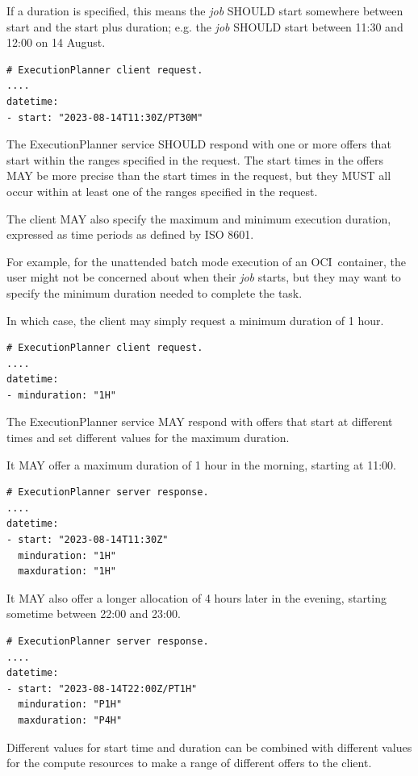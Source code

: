 \documentclass[11pt,a4paper]{ivoa}
\newcommand{\execplanner} {ExecutionPlanner}
\newcommand{\ocicontainer} {OCI~container}
\newcommand{\job} {\textit{job}}
\begin{document}
If a duration is specified, this means the \job{} SHOULD start somewhere between
start and the start plus duration;
e.g. the \job{} SHOULD start between 11:30 and 12:00 on 14 August.
\begin{lstlisting}[]
# ExecutionPlanner client request.
....
datetime:
- start: "2023-08-14T11:30Z/PT30M"
\end{lstlisting}

The \execplanner{} service SHOULD respond with one or more offers that start within
the ranges specified in the request.
The start times in the offers MAY be more precise than the start times in the request,
but they MUST all occur within at least one of the ranges specified in the request.

The client MAY also specify the maximum and minimum execution duration,
expressed as time periods as defined by ISO 8601.

For example, for the unattended batch mode execution of an \ocicontainer, the user might not be concerned about
when their \job{} starts, but they may want to specify the minimum duration needed to complete the task.

In which case, the client may simply request a minimum duration of 1 hour.
\begin{lstlisting}[]
# ExecutionPlanner client request.
....
datetime:
- minduration: "1H"
\end{lstlisting}

The \execplanner{} service MAY respond with offers that start at different times and
set different values for the maximum duration.

It MAY offer a maximum duration of 1 hour in the morning, starting at 11:00.
\begin{lstlisting}[]
# ExecutionPlanner server response.
....
datetime:
- start: "2023-08-14T11:30Z"
  minduration: "1H"
  maxduration: "1H"
\end{lstlisting}

It MAY also offer a longer allocation of 4 hours later in the evening,
starting sometime between 22:00 and 23:00.
\begin{lstlisting}[]
# ExecutionPlanner server response.
....
datetime:
- start: "2023-08-14T22:00Z/PT1H"
  minduration: "P1H"
  maxduration: "P4H"
\end{lstlisting}

Different values for start time and duration can be combined with different values for the
compute resources to make a range of different offers to the client.
\end{document}

